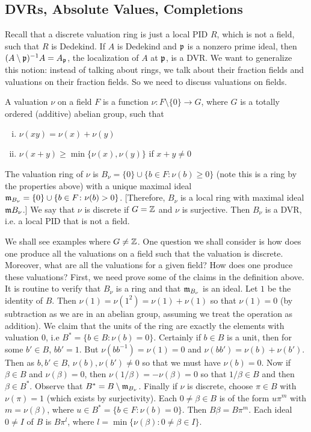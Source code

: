 \newpage
\subsection{DVRs, Absolute Values, Completions\label{sec:620_9}}

Recall that a discrete valuation ring is just a local PID $R$, which is not a field, such that $R$ is Dedekind. If $A$ is Dedekind and $\mathfrak{p}$ is a nonzero prime ideal, then $(A \setminus \mathfrak{p})^{-1}A=A_{\mathfrak{p}}$, the localization of $A$ at $\mathfrak{p}$, is a DVR. We want to generalize this notion: instead of talking about rings, we talk about their fraction fields and valuations on their fraction fields. So we need to discuss valuations on fields. 

\begin{dfn}
A valuation $\nu$ on a field $F$ is a function $\nu: F \setminus\{0\} \to G$, where $G$ is a totally ordered (additive) abelian group, such that 
	\begin{enumerate}[(i)]
	\item $\nu(xy)=\nu(x)+\nu(y)$ 
	\item $\nu(x+y) \geq \min\{\nu(x),\nu(y)\}$ if $x+y \neq 0$
	\end{enumerate}
The valuation ring of $\nu$ is $B_\nu=\{0\} \cup \{b \in F \colon \nu(b) \geq 0\}$ (note this is a ring by the properties above) with a unique maximal ideal $\mathfrak{m}_{B_\nu}=\{0\} \cup \{b \in F \colon \nu(b)>0\}$. [Therefore, $B_\nu$ is a local ring with maximal ideal $\mathfrak{m} B_\nu$.] We say that $\nu$ is discrete if $G=\mathbb{Z}$ and $\nu$ is surjective. Then $B_\nu$ is a DVR, i.e. a local PID that is not a field. 
\end{dfn}

We shall see examples where $G \neq \mathbb{Z}$. One question we shall consider is how does one produce all the valuations on a field such that the valuation is discrete. Moreover, what are all the valuations for a given field? How does one produce these valuations? First, we need prove some of the claims in the definition above. It is routine to verify that $B_\nu$ is a ring and that $\mathfrak{m}_{B_\nu}$ is an ideal. Let $1$ be the identity of $B$. Then $\nu(1)=\nu(1^2)=\nu(1)+\nu(1)$ so that $\nu(1)=0$ (by subtraction as we are in an abelian group, assuming we treat the operation as addition). We claim that the units of the ring are exactly the elements with valuation 0, i.e $B^*=\{b \in B \colon \nu(b)=0\}$. Certainly if $b \in B$ is a unit, then for some $b' \in B$, $bb'=1$. But $\nu(bb^{-1})=\nu(1)=0$ and $\nu(bb')=\nu(b)+\nu(b')$. Then as $b,b' \in B$, $\nu(b),\nu(b') \neq 0$ so that we must have $\nu(b)=0$. Now if $\beta \in B$ and $\nu(\beta)=0$, then $\nu(1/\beta)= -\nu(\beta)=0$ so that $1/\beta \in B$ and then $\beta \in B^*$. Observe that $B^*= B \setminus \mathfrak{m}_{B_\nu}$. Finally if $\nu$ is discrete, choose $\pi \in B$ with $\nu(\pi)=1$ (which exists by surjectivity). Each $0 \neq \beta \in B$ is of the form $u\pi^m$ with $m=\nu(\beta)$, where $u \in B^*=\{b \in F \colon \nu(b)=0\}$. Then $B\beta= B\pi^m$. Each ideal $0 \neq I$ of $B$ is $B \pi^l$, where $l=\min\{ \nu(\beta) \colon 0 \neq \beta \in I\}$. 


